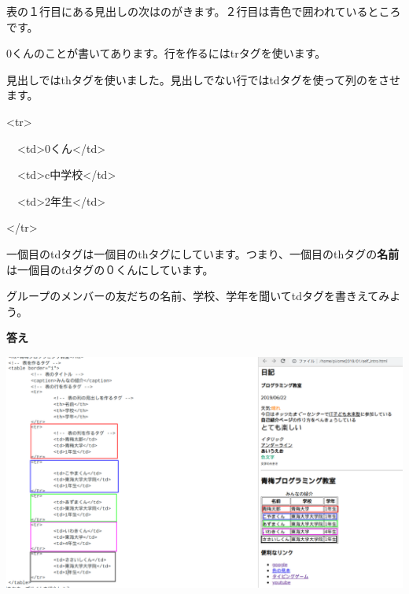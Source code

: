 \documentclass[a4paper,12pt]{jarticle}
\begin{document}
\flushleft

\bigskip

表の１行目にある見出しの次はのがきます。２行目は青色で囲われているところです。

0くんのことが書いてあります。行を作るにはtrタグを使います。

見出しではthタグを使いました。見出しでない行ではtdタグを使って列のをさせます。

{\textless}tr{\textgreater}

\ \ {\textless}td{\textgreater}0くん{\textless}/td{\textgreater}

\ \ {\textless}td{\textgreater}c中学校{\textless}/td{\textgreater}

\ \ {\textless}td{\textgreater}2年生{\textless}/td{\textgreater}

{\textless}/tr{\textgreater}

一個目のtdタグは一個目のthタグにしています。つまり、一個目のthタグの\textbf{名前}は一個目のtdタグの０くんにしています。


\bigskip


\bigskip

グループのメンバーの友だちの名前、学校、学年を聞いてtdタグを書きえてみよう。


\bigskip


\bigskip



\bigskip

\clearpage
\textbf{答え}




\bigskip


\bigskip


\bigskip
\includegraphics[width=\textwidth]{textbook-img192.png}
\end{document}
